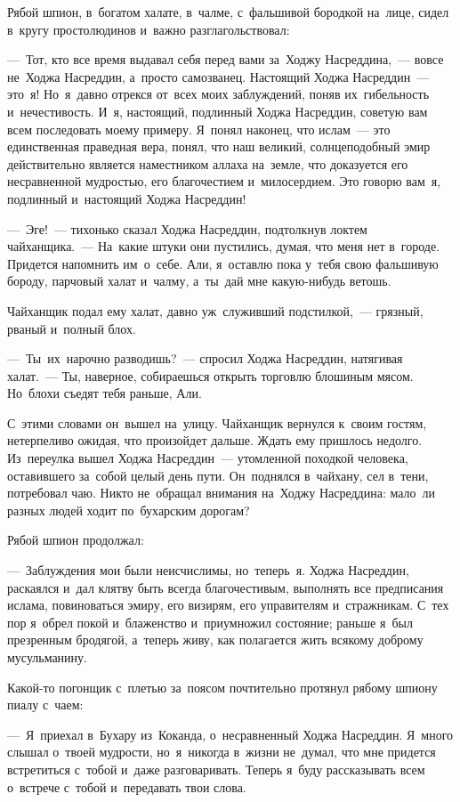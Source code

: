 \documentclass[12pt,a4paper]{book}
\begin{document}
Рябой шпион, в~богатом халате, в~чалме, с~фальшивой бородкой на~лице, сидел в~кругу простолюдинов и~важно разглагольствовал:

—~Тот, кто все время выдавал себя перед вами за~Ходжу Насреддина,~— вовсе не~Ходжа Насреддин, а~просто самозванец. Настоящий Ходжа Насреддин~— это~я! Но~я~давно отрекся от~всех моих заблуждений, поняв их~гибельность и~нечестивость. И~я, настоящий, подлинный Ходжа Насреддин, советую вам всем последовать моему примеру. Я~понял наконец, что ислам~— это единственная праведная вера, понял, что наш великий, солнцеподобный эмир действительно является наместником аллаха на~земле, что доказуется его несравненной мудростью, его благочестием и~милосердием. Это говорю вам~я, подлинный и~настоящий Ходжа Насреддин!

—~Эге!~— тихонько сказал Ходжа Насреддин, подтолкнув локтем чайханщика.~— На~какие штуки они пустились, думая, что меня нет в~городе. Придется напомнить им~о~себе. Али, я~оставлю пока у~тебя свою фальшивую бороду, парчовый халат и~чалму, а~ты~дай мне какую-нибудь ветошь.

Чайханщик подал ему халат, давно уж~служивший подстилкой,~— грязный, рваный и~полный блох.

—~Ты~их~нарочно разводишь?~— спросил Ходжа Насреддин, натягивая халат.~— Ты, наверное, собираешься открыть торговлю блошиным мясом. Но~блохи съедят тебя раньше, Али.

С~этими словами он~вышел на~улицу. Чайханщик вернулся к~своим гостям, нетерпеливо ожидая, что произойдет дальше. Ждать ему пришлось недолго. Из~переулка вышел Ходжа Насреддин~— утомленной походкой человека, оставившего за~собой целый день пути. Он~поднялся в~чайхану, сел в~тени, потребовал чаю. Никто не~обращал внимания на~Ходжу Насреддина: мало~ли разных людей ходит по~бухарским дорогам?

Рябой шпион продолжал:

—~Заблуждения мои были неисчислимы, но~теперь~я. Ходжа Насреддин, раскаялся и~дал клятву быть всегда благочестивым, выполнять все предписания ислама, повиноваться эмиру, его визирям, его управителям и~стражникам. С~тех пор я~обрел покой и~блаженство и~приумножил состояние; раньше я~был презренным бродягой, а~теперь живу, как полагается жить всякому доброму мусульманину.

Какой-то погонщик с~плетью за~поясом почтительно протянул рябому шпиону пиалу с~чаем:

—~Я~приехал в~Бухару из~Коканда, о~несравненный Ходжа Насреддин. Я~много слышал о~твоей мудрости, но~я~никогда в~жизни не~думал, что мне придется встретиться с~тобой и~даже разговаривать. Теперь я~буду рассказывать всем о~встрече с~тобой и~передавать твои слова.
\end{document}
